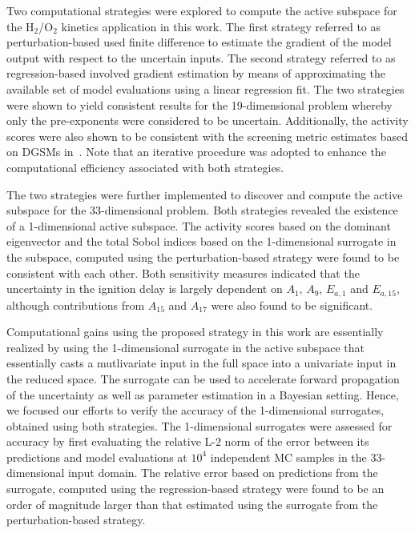 Two computational strategies were explored to compute the active subspace for the H$_2$/O$_2$
kinetics application in this work. The first strategy referred to as perturbation-based
used finite difference to estimate the gradient of the model output with respect to the uncertain
inputs. The second strategy referred to as regression-based involved gradient estimation by
means of approximating the available set of model evaluations using a linear regression fit. 
The two strategies were shown to yield
consistent results for the 19-dimensional problem whereby only the pre-exponents were considered to be uncertain.
Additionally, the activity scores were also shown to be consistent with the screening metric estimates based on
DGSMs in~\cite{Vohra:2018}. Note that an iterative procedure was adopted to enhance the computational efficiency
associated with both strategies. 

The two strategies were further implemented to discover and compute the active
subspace for the 33-dimensional problem. Both strategies revealed the existence of a 1-dimensional
active subspace. The activity scores based on the dominant eigenvector and the total Sobol indices
based on the 1-dimensional surrogate in the subspace, computed using the 
perturbation-based strategy were found to be consistent with each other. Both sensitivity measures
 indicated that the uncertainty in the ignition delay is largely dependent on $A_1$, $A_9$, 
$E_{a,1}$ and $E_{a,15}$, although contributions from $A_{15}$ and $A_{17}$ were also found to be significant. 

Computational gains using the proposed strategy in this work are essentially realized by using the
1-dimensional surrogate in the active subspace that essentially casts a mutlivariate input in the full space
into a univariate input in the reduced space. The surrogate can be used to accelerate forward propagation
of the uncertainty as well as parameter estimation in a Bayesian setting. Hence, we focused our efforts to
verify the accuracy of the 1-dimensional surrogates, obtained using both strategies.  
The 1-dimensional surrogates were assessed for accuracy by first evaluating the relative L-2
norm of the error between its predictions and model evaluations at $10^4$ independent MC samples in the
33-dimensional input domain. The relative error based on predictions from the surrogate, computed
using the regression-based strategy were found to be an order of magnitude larger than that estimated
using the surrogate from the perturbation-based strategy.


